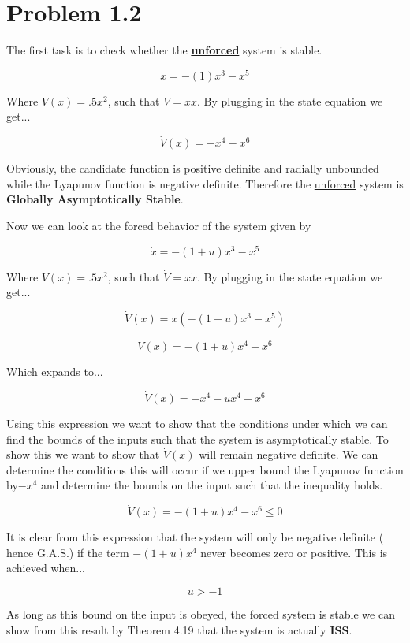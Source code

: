 \section*{Problem 1.2}


The first task is to check whether the \textbf{\underline{unforced}} system is stable.

$$
\dot{x} = -(1)x^3 - x^5
$$

\noindent Where $V(x) = .5x^2$, such that $\dot{V} = x\dot{x}$. By plugging in the state equation we get...

$$
\dot{V}(x) = -x^4 - x^6
$$

\noindent Obviously, the candidate function is positive definite and radially unbounded while the Lyapunov function is negative definite. Therefore the \underline{unforced} system is \textbf{Globally Asymptotically Stable}.

\noindent Now we can look at the forced behavior of the system given by


$$
\dot{x} = -(1+u)x^3 - x^5
$$

\noindent Where $V(x) = .5x^2$, such that $\dot{V} = x\dot{x}$. By plugging in the state equation we get...

$$
\dot{V}(x) = x(-(1+u)x^3 - x^5)
$$

$$
\dot{V}(x) = -(1+u)x^4 -x^6
$$

\noindent Which expands to...

$$
\dot{V}(x) = -x^4 -ux^4 -x^6
$$

\noindent Using this expression we want to show that the conditions under which we can find the bounds of the inputs such that the system is asymptotically stable. To show this we want to show that $\dot{V}(x)$ will remain negative definite. We can determine the conditions this will occur if we upper bound the Lyapunov function by$-x^4$ and determine the bounds on the input such that the inequality holds.

$$
\dot{V}(x) = -(1 + u)x^4 -x^6 \leq 0
$$

\noindent It is clear from this expression that the system will only be negative definite ( hence G.A.S.) if the term $-(1+u)x^4$ never becomes zero or positive. This is achieved when...

$$
u> -1
$$

\noindent As long as this bound on the input is obeyed, the forced system is stable we can show from this result by Theorem 4.19 that the system is actually \textbf{ISS}.

